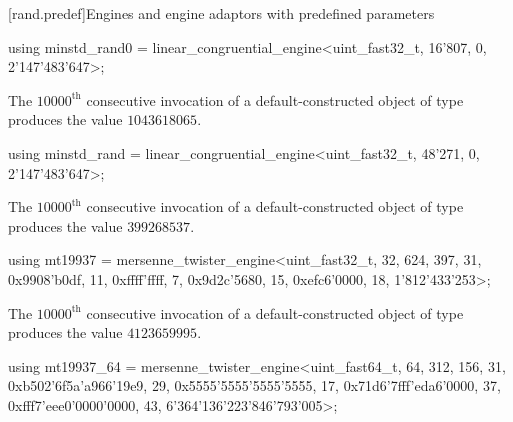 [rand.predef]{Engines and engine adaptors with predefined parameters}%
%
%

%
%
\begin{itemdecl}
using minstd_rand0 =
      linear_congruential_engine<uint_fast32_t, 16'807, 0, 2'147'483'647>;
\end{itemdecl}

\begin{itemdescr}
\pnum
\required
 The $10000^\text{th}$ consecutive invocation
 of a default-constructed object
 of type 
 produces the value $1043618065$.
\end{itemdescr}

%
%
\begin{itemdecl}
using minstd_rand =
      linear_congruential_engine<uint_fast32_t, 48'271, 0, 2'147'483'647>;
\end{itemdecl}

\begin{itemdescr}
\pnum
\required
 The $10000^\text{th}$ consecutive invocation
 of a default-constructed object
 of type 
 produces the value $399268537$.
\end{itemdescr}

%
%
\begin{itemdecl}
using mt19937 =
      mersenne_twister_engine<uint_fast32_t, 32, 624, 397, 31,
       0x9908'b0df, 11, 0xffff'ffff, 7, 0x9d2c'5680, 15, 0xefc6'0000, 18, 1'812'433'253>;
\end{itemdecl}

\begin{itemdescr}
\pnum
\required
 The $10000^\text{th}$ consecutive invocation
 of a default-constructed object
 of type 
 produces the value $4123659995$.
\end{itemdescr}

%
%
\begin{itemdecl}
using mt19937_64 =
      mersenne_twister_engine<uint_fast64_t, 64, 312, 156, 31,
       0xb502'6f5a'a966'19e9, 29, 0x5555'5555'5555'5555, 17,
       0x71d6'7fff'eda6'0000, 37, 0xfff7'eee0'0000'0000, 43, 6'364'136'223'846'793'005>;
\end{itemdecl}

